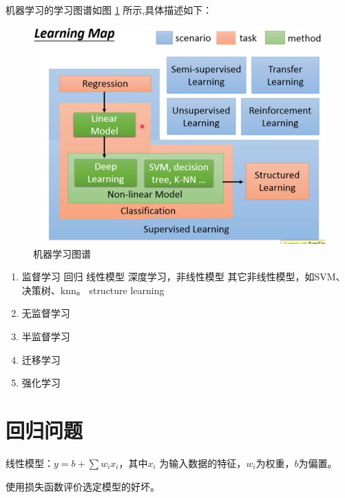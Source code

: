 \documentclass[UTF8]{ctexbook}
\begin{document}
机器学习的学习图谱如图 \ref{fig:ml_map} 所示,具体描述如下：

\begin{figure}[h]
	\centering
	\includegraphics[scale=0.4]{./pic/learning_map.png}
	\caption{机器学习图谱}
	\label{fig:ml_map}
\end{figure}
	
\begin{enumerate}
	\item 监督学习
		\subitem 回归
		\subitem 线性模型
		\subitem 深度学习，非线性模型
		\subitem 其它非线性模型，如SVM、决策树、knn。
		\subitem structure learning
	\item 无监督学习
	\item 半监督学习
	\item 迁移学习
	\item 强化学习

\end{enumerate}

\section{回归问题}
线性模型：$y=b+\sum w_i x_i$，其中$x_i$ 为输入数据的特征，$w_i$为权重，$b$为偏置。

使用损失函数评价选定模型的好坏。
\end{document}
